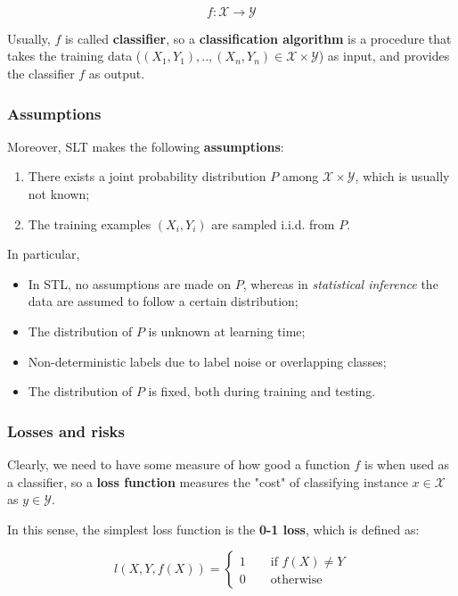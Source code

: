 $$
f: \mathcal{X} \xrightarrow{} \mathcal{Y}
$$

Usually, $f$ is called \textbf{classifier}, so a \textbf{classification algorithm} is a procedure that takes the training data ($(X_1, Y_1), .., (X_n, Y_n) \in \mathcal{X} \times \mathcal{Y}$) as input, and provides the classifier $f$ as output.

\subsubsection{Assumptions}
Moreover, SLT makes the following \textbf{assumptions}:

\begin{enumerate}
    \item There exists a joint probability distribution $P$ among $\mathcal{X} \times \mathcal{Y}$, which is usually not known;
    \item The training examples $(X_i, Y_i)$ are sampled i.i.d. from $P$.
\end{enumerate}

In particular, 

\begin{itemize}
    \item In STL, no assumptions are made on $P$, whereas in \textit{statistical inference} the data are assumed to follow a certain distribution;
    \item The distribution of $P$ is unknown at learning time;
    \item Non-deterministic labels due to label noise or overlapping classes;
    \item The distribution of $P$ is fixed, both during training and testing.
\end{itemize}

\subsubsection{Losses and risks}
Clearly, we need to have some measure of how good a function $f$ is when used as a classifier, so a \textbf{loss function} measures the "cost" of classifying instance $x \in \mathcal{X}$ as $y \in \mathcal{Y}$. 

In this sense, the simplest loss function is the \textbf{0-1 loss}, which is defined as:

$$
l(X,Y,f(X)) = \begin{cases}
    1 \qquad \text{if } f(X) \neq Y \\
    0 \qquad \text{otherwise}
\end{cases}
$$

